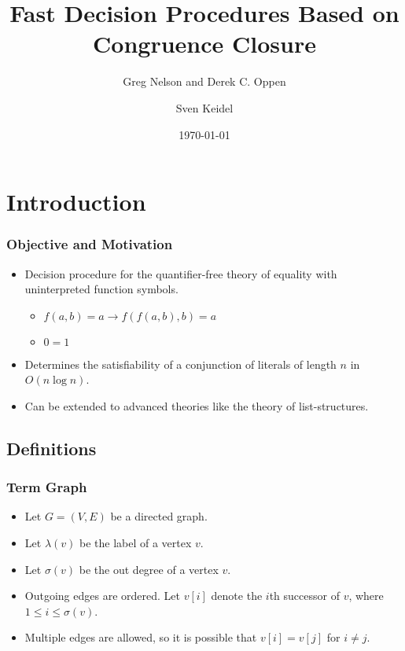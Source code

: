 \documentclass[fleqn,t]{beamer}
\title{Fast Decision Procedures Based on Congruence Closure}
\subtitle{Greg Nelson and Derek C. Oppen}
\author{Sven Keidel}
\date{\today}
\begin{document}
\maketitle

\section{Introduction}

\begin{frame}
  \frametitle{Objective and Motivation}

  \begin{itemize}
    \item Decision procedure for the quantifier-free theory of equality with
      uninterpreted function symbols.
      \begin{itemize}
        \item $f(a,b) = a \rightarrow f(f(a,b),b) = a$
        \item $0 = 1$
      \end{itemize}

    \item Determines the satisfiability of a conjunction of
      literals of length $n$ in $O(n \log n)$.

    \item Can be extended to advanced theories like the theory of
      list-structures.
  \end{itemize}

\end{frame}


\subsection{Definitions}

\begin{frame}
  \frametitle{Term Graph}

  \begin{Definition}
    \begin{itemize}
      \item Let $G = (V,E)$ be a directed graph.
      \item Let $\lambda(v)$ be the label of a vertex $v$.
      \item Let $\sigma(v)$ be the out degree of a vertex $v$.
      \item Outgoing edges are ordered. Let $v[i]$ denote the $i$th successor of
        $v$, where $1 \leq i \leq \sigma(v)$.
      \item Multiple edges are allowed, so it is possible that $v[i] = v[j]$ for
        $i \neq j$.
    \end{itemize}
  \end{Definition}

\end{frame}
\end{document}
